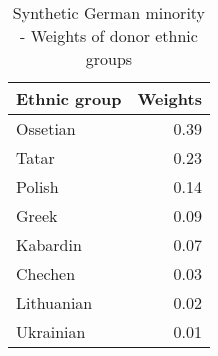 \begin{table}[t]

\caption{\label{tab:}Synthetic German minority - Weights of donor ethnic groups}
\centering
\begin{tabular}{lr}
\toprule
Ethnic group & Weights\\
\midrule
Ossetian & 0.39\\
Tatar & 0.23\\
Polish & 0.14\\
Greek & 0.09\\
Kabardin & 0.07\\
Chechen & 0.03\\
Lithuanian & 0.02\\
Ukrainian & 0.01\\
\bottomrule
\end{tabular}
\end{table}